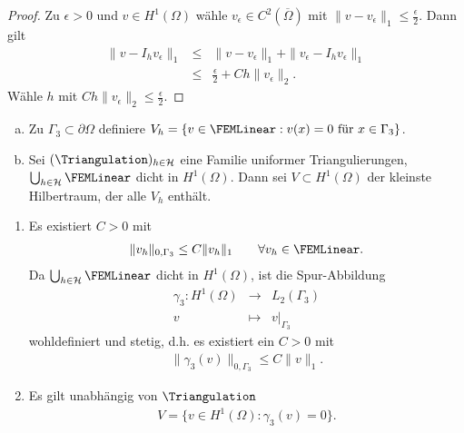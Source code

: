 \begin{proof}
    Zu $\epsilon > 0$ und $v\in H^1(\Omega)$ wähle
    $v_\epsilon\in C^2(\overline\Omega)$ mit
    $\|v - v_\epsilon\|_1 \le \frac{\epsilon}{2}$.
    Dann gilt
    \begin{eqnarray*}
            \|v - I_h v_\epsilon\|_1
        &\le& \|v - v_\epsilon\|_1 + \|v_\epsilon - I_h v_\epsilon\|_1 \\
        &\le& \frac{\epsilon}{2} + C h \|v_\epsilon\|_2.
    \end{eqnarray*}
    Wähle $h$ mit $C h \|v_\epsilon\|_2 \le \frac{\epsilon}{2}$.
\end{proof}


\begin{Definition}
    \label{def:3.19}
    \begin{enumerate}[a)]
      \item
        Zu $\Gamma_3 \subset \partial\Omega$ definiere $V_h = \{v\in
        \FEMLinear: v(x) = 0 \text{ für } x\in \Gamma_3\}$.
      \item
        Sei $(\Triangulation)_{h\in\mathcal{H}}$ eine Familie uniformer
        Triangulierungen, $\bigcup_{h\in\mathcal{H}} \FEMLinear$ dicht in
        $H^1(\Omega)$. Dann sei $V \subset H^1(\Omega)$ der kleinste
        Hilbertraum, der alle $V_h$ enthält.
    \end{enumerate}
\end{Definition}


\begin{Bemerkung}
    \begin{enumerate}[1)]
      \item
        Es existiert $C > 0$ mit
        \begin{eqnarray*}
                \|v_h\|_{0,\Gamma_3}
            \le C \|v_h\|_1 \qquad \forall v_h\in \FEMLinear.
        \end{eqnarray*}
        Da $\bigcup_{h\in\mathcal{H}} \FEMLinear$ dicht in $H^1(\Omega)$,
        ist die Spur-Abbildung
        \begin{eqnarray*}
            \gamma_3: H^1(\Omega) &\to& L_2(\Gamma_3) \\
            v &\mapsto& v|_{\Gamma_3}
        \end{eqnarray*}
        wohldefiniert und stetig, d.h. es existiert ein $C>0$ mit
        \begin{eqnarray*}
            \|\gamma_3(v)\|_{0,\Gamma_3} \le C \|v\|_1.
        \end{eqnarray*}
      \item
        Es gilt unabhängig von $\Triangulation$
        \begin{eqnarray*}
            V = \{v\in H^1(\Omega): \gamma_3(v) = 0\}.
        \end{eqnarray*}
    \end{enumerate}
\end{Bemerkung}


